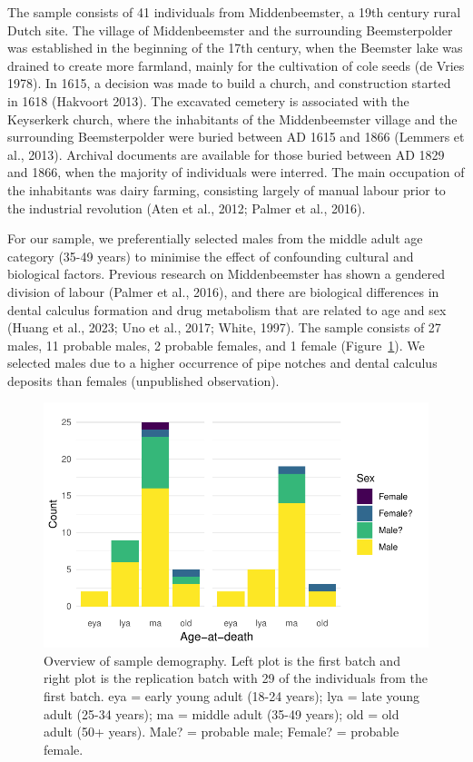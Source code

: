 \documentclass[
]{article}
\begin{document}
The sample consists of 41 individuals from Middenbeemster, a 19th
century rural Dutch site. The village of Middenbeemster and the
surrounding Beemsterpolder was established in the beginning of the 17th
century, when the Beemster lake was drained to create more farmland,
mainly for the cultivation of cole seeds (de Vries 1978). In 1615, a
decision was made to build a church, and construction started in 1618
(Hakvoort 2013). The excavated cemetery is associated with the
Keyserkerk church, where the inhabitants of the Middenbeemster village
and the surrounding Beemsterpolder were buried between AD 1615 and 1866
(Lemmers et al., 2013). Archival documents are available for those
buried between AD 1829 and 1866, when the majority of individuals were
interred. The main occupation of the inhabitants was dairy farming,
consisting largely of manual labour prior to the industrial revolution
(Aten et al., 2012; Palmer et al., 2016).

For our sample, we preferentially selected males from the middle adult
age category (35-49 years) to minimise the effect of confounding
cultural and biological factors. Previous research on Middenbeemster has
shown a gendered division of labour (Palmer et al., 2016), and there are
biological differences in dental calculus formation and drug metabolism
that are related to age and sex (Huang et al., 2023; Uno et al., 2017;
White, 1997). The sample consists of 27 males, 11 probable males, 2
probable females, and 1 female (Figure~\ref{fig-sample-demography}). We
selected males due to a higher occurrence of pipe notches and dental
calculus deposits than females (unpublished observation).

\begin{figure}

{\centering \includegraphics{paper_files/figure-pdf/fig-sample-demography-1.pdf}

}

\caption{\label{fig-sample-demography}Overview of sample demography.
Left plot is the first batch and right plot is the replication batch
with 29 of the individuals from the first batch. eya = early young adult
(18-24 years); lya = late young adult (25-34 years); ma = middle adult
(35-49 years); old = old adult (50+ years). Male? = probable male;
Female? = probable female.}

\end{figure}
\end{document}
